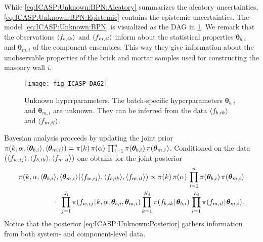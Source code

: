While \cref{eq:ICASP:Unknown:BPN:Aleatory} summarizes the aleatory uncertainties, \cref{eq:ICASP:Unknown:BPN:Epistemic} contains the epistemic uncertainties.
The model \cref{eq:ICASP:Unknown:BPN} is visualized as the DAG in \cref{fig:ICASP:DAG:2}.
We remark that the observations \(\langle{f_{b,ik}}\rangle\) and \(\langle{f_{m,il}}\rangle\) inform about the statistical properties \(\bm{\theta}_{b,i}\) and \(\bm{\theta}_{m,i}\) of the component ensembles. 
This way they give information about the unobservable properties of the brick and mortar samples used for constructing the masonry wall \(i\).
\begin{figure}[htbp]
  \centering
  \texttt{[image: fig\_ICASP\_DAG2]}
  \caption[Unknown hyperparameters]{Unknown hyperparameters.
           The batch-specific hyperparameters \(\bm{\theta}_{b,i}\) and \(\bm{\theta}_{m,i}\) are unknown.
           They can be inferred from the data \(\langle{f_{b,ik}}\rangle\) and \(\langle{f_{m,il}}\rangle\).
          }
  \label{fig:ICASP:DAG:2}
\end{figure}
\par %
Bayesian analysis proceeds by updating the joint prior \(\pi(k,\alpha,\langle{\bm{\theta}_{b,i}}\rangle,\langle{\bm{\theta}_{m,i}}\rangle) = \pi(k) \, \pi(\alpha) \, \prod_{i=1}^n \pi(\bm{\theta}_{b,i}) \, \pi(\bm{\theta}_{m,i})\).
Conditioned on the data \((\langle{f_{w,ij}}\rangle,\langle{f_{b,ik}}\rangle,\langle{f_{m,il}}\rangle)\) one obtains for the joint posterior
\begin{equation} \label{eq:ICASP:Unknown:Posterior}
  \begin{aligned}
    \pi(k,\alpha,\tuple{\bm{\theta}_{b,i}},\tuple{\bm{\theta}_{m,i}} \cond \tuple{f_{w,ij}},\tuple{f_{b,ik}},\tuple{f_{m,il}})
    \propto \pi(k) \, \pi(\alpha) \, \prod\limits_{i=1}^n \pi(\bm{\theta}_{b,i}) \, \pi(\bm{\theta}_{m,i}) \\
    \cdot \;\, \prod\limits_{j=1}^{J_i} \pi(f_{w,ij} \cond k,\alpha,\bm{\theta}_{b,i},\bm{\theta}_{m,i})
    \prod\limits_{k=1}^{K_i} \pi(f_{b,ik} \cond \bm{\theta}_{b,i}) \, \prod\limits_{l=1}^{L_i} \pi(f_{m,il} \cond \bm{\theta}_{m,i}).
  \end{aligned}
\end{equation}
Notice that the posterior \cref{eq:ICASP:Unknown:Posterior} gathers information from both system- and component-level data.